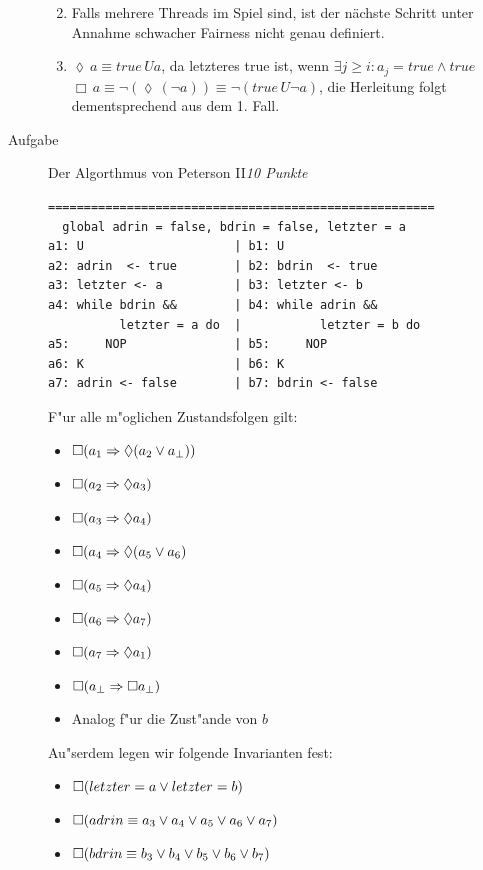 \documentclass[a4paper,twoside,12pt]{article}
\newcounter{AUFGNR}
\newcommand{\AUFGABE}[2]{\vspace{0.3cm}\item[Aufgabe~\arabic{AUFGNR}]\stepcounter{AUFGNR} #1\hfill\emph{#2}}
\begin{document}
\begin{description}
\begin{enumerate}
\begin{enumerate}
\end{enumerate}

\item
Falls mehrere Threads im Spiel sind, ist der nächste Schritt unter Annahme schwacher Fairness nicht genau definiert.

\item
$ \lozenge\, a \equiv true\, Ua$, da letzteres true ist, wenn $\exists j\geq i: a_j = true \land true $\\

$ \Box\, a \equiv \neg (\lozenge\, (\neg a)) \equiv \neg (true\, U\neg a)$, die Herleitung folgt dementsprechend aus dem 1. Fall.\\

\end{enumerate}

\AUFGABE{Der Algorthmus von Peterson II}{10 Punkte}
\begin{verbatim}
======================================================
  global adrin = false, bdrin = false, letzter = a
a1: U                     | b1: U
a2: adrin  <- true        | b2: bdrin  <- true
a3: letzter <- a          | b3: letzter <- b
a4: while bdrin &&        | b4: while adrin &&
          letzter = a do  |           letzter = b do
a5:     NOP               | b5:     NOP
a6: K                     | b6: K
a7: adrin <- false        | b7: bdrin <- false
\end{verbatim}
F"ur alle m"oglichen Zustandsfolgen gilt:
\begin{itemize}
	\item $\Box(a_1 \Rightarrow \lozenge (a_2 \vee a_\bot))$
	\item $\Box(a_2 \Rightarrow \lozenge a_3)$
	\item $\Box(a_3 \Rightarrow \lozenge a_4)$
	\item $\Box(a_4 \Rightarrow \lozenge (a_5 \vee a_6)$
	\item $\Box(a_5 \Rightarrow \lozenge a_4)$
	\item $\Box(a_6 \Rightarrow \lozenge a_7)$
	\item $\Box(a_7 \Rightarrow \lozenge a_1)$
	\item $\Box(a_\bot \Rightarrow \Box a_\bot)$
	\item Analog f"ur die Zust"ande von $b$
\end{itemize}

Au"serdem legen wir folgende Invarianten fest:
\begin{itemize}
	\item $\Box(letzter = a \vee letzter = b)$
	\item $\Box(adrin \equiv a_3 \vee a_4 \vee a_5 \vee a_6 \vee a_7)$
	\item $\Box(bdrin \equiv b_3 \vee b_4 \vee b_5 \vee b_6 \vee b_7)$
\end{itemize}


\end{description}
\end{document}
